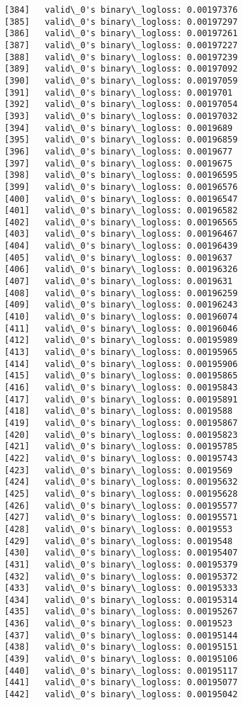 \documentclass[11pt]{article}
\begin{document}
\begin{Verbatim}[commandchars=\\\{\}]
[384]	valid\_0's binary\_logloss: 0.00197376
[385]	valid\_0's binary\_logloss: 0.00197297
[386]	valid\_0's binary\_logloss: 0.00197261
[387]	valid\_0's binary\_logloss: 0.00197227
[388]	valid\_0's binary\_logloss: 0.00197239
[389]	valid\_0's binary\_logloss: 0.00197092
[390]	valid\_0's binary\_logloss: 0.00197059
[391]	valid\_0's binary\_logloss: 0.0019701
[392]	valid\_0's binary\_logloss: 0.00197054
[393]	valid\_0's binary\_logloss: 0.00197032
[394]	valid\_0's binary\_logloss: 0.0019689
[395]	valid\_0's binary\_logloss: 0.00196859
[396]	valid\_0's binary\_logloss: 0.0019677
[397]	valid\_0's binary\_logloss: 0.0019675
[398]	valid\_0's binary\_logloss: 0.00196595
[399]	valid\_0's binary\_logloss: 0.00196576
[400]	valid\_0's binary\_logloss: 0.00196547
[401]	valid\_0's binary\_logloss: 0.00196582
[402]	valid\_0's binary\_logloss: 0.00196565
[403]	valid\_0's binary\_logloss: 0.00196467
[404]	valid\_0's binary\_logloss: 0.00196439
[405]	valid\_0's binary\_logloss: 0.0019637
[406]	valid\_0's binary\_logloss: 0.00196326
[407]	valid\_0's binary\_logloss: 0.0019631
[408]	valid\_0's binary\_logloss: 0.00196259
[409]	valid\_0's binary\_logloss: 0.00196243
[410]	valid\_0's binary\_logloss: 0.00196074
[411]	valid\_0's binary\_logloss: 0.00196046
[412]	valid\_0's binary\_logloss: 0.00195989
[413]	valid\_0's binary\_logloss: 0.00195965
[414]	valid\_0's binary\_logloss: 0.00195906
[415]	valid\_0's binary\_logloss: 0.00195865
[416]	valid\_0's binary\_logloss: 0.00195843
[417]	valid\_0's binary\_logloss: 0.00195891
[418]	valid\_0's binary\_logloss: 0.0019588
[419]	valid\_0's binary\_logloss: 0.00195867
[420]	valid\_0's binary\_logloss: 0.00195823
[421]	valid\_0's binary\_logloss: 0.00195785
[422]	valid\_0's binary\_logloss: 0.00195743
[423]	valid\_0's binary\_logloss: 0.0019569
[424]	valid\_0's binary\_logloss: 0.00195632
[425]	valid\_0's binary\_logloss: 0.00195628
[426]	valid\_0's binary\_logloss: 0.00195577
[427]	valid\_0's binary\_logloss: 0.00195571
[428]	valid\_0's binary\_logloss: 0.0019553
[429]	valid\_0's binary\_logloss: 0.0019548
[430]	valid\_0's binary\_logloss: 0.00195407
[431]	valid\_0's binary\_logloss: 0.00195379
[432]	valid\_0's binary\_logloss: 0.00195372
[433]	valid\_0's binary\_logloss: 0.00195333
[434]	valid\_0's binary\_logloss: 0.00195314
[435]	valid\_0's binary\_logloss: 0.00195267
[436]	valid\_0's binary\_logloss: 0.0019523
[437]	valid\_0's binary\_logloss: 0.00195144
[438]	valid\_0's binary\_logloss: 0.00195151
[439]	valid\_0's binary\_logloss: 0.00195106
[440]	valid\_0's binary\_logloss: 0.00195117
[441]	valid\_0's binary\_logloss: 0.00195077
[442]	valid\_0's binary\_logloss: 0.00195042

\end{Verbatim}
\end{document}
